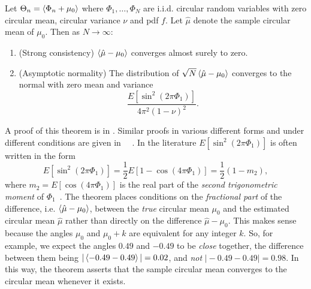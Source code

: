 \documentclass[journal]{../bib/IEEEtran}
\begin{document}
\begin{theorem}\label{thm:asymp_arg_complex_mean}
Let $\Theta_n = \left< \Phi_n + \mu_0 \right>$ where $\Phi_1, \dots, \Phi_N$ are i.i.d. circular random variables with zero circular mean, circular variance $\nu$ and pdf $f$. Let $\hat{\mu}$ denote the sample circular mean of $\mu_0$. Then as $N\rightarrow\infty$:
\begin{enumerate}
\item (Strong consistency) $\left< \hat{\mu} - \mu_0 \right>$ converges almost surely to zero.
\item (Asymptotic normality) The distribution of $\sqrt{N}\left< \hat{\mu} - \mu_0 \right>$ converges to the normal with zero mean and variance 
\begin{equation}\label{eq:asympvarscm}
\frac{E[\sin^2(2\pi\Phi_1)]}{4\pi^2(1 - \nu)^2}.
\end{equation}
\end{enumerate}
\end{theorem}
A proof of this theorem is in \cite[p.~88]{McKilliam2010thesis}. Similar proofs in various different forms and under different conditions are given in \cite{Quinn2009_dasp_phase_only_information_loss,Fisher_common_mean_direction_dir_est_no_dist_assumptions1983}~\cite[Chapter~4]{Jammalamadaka_dir_stat_book}~\cite[p.~111]{mardia_stat_dir_data_book_1975}. In the literature $E[\sin^2(2\pi\Phi_1)]$ is often written in the form
\[
E[\sin^2(2\pi\Phi_1)] = \frac{1}{2} E[ 1 - \cos(4\pi\Phi_1) ] = \frac{1}{2}(1 - m_2),
\]
where $m_2 = E[\cos(4\pi\Phi_1)]$ is the real part of the \emph{second trigonometric moment} of $\Phi_1$~\cite{Fisher_common_mean_direction_dir_est_no_dist_assumptions1983,Fisher1993,Bhattacharya_int_ext_means_2003}.  The theorem places conditions on the \emph{fractional part} of the difference, i.e. $\left< \hat{\mu} - \mu_0 \right>$, between the \emph{true} circular mean $\mu_0$ and the estimated circular mean $\hat{\mu}$ rather than directly on the difference $\hat{\mu} - \mu_0$.  This makes sense because the angles $\mu_0$ and $\mu_0 + k$ are equivalent for any integer $k$. So, for example, we expect the angles $0.49$ and $-0.49$ to be \emph{close} together, the difference between them being $\vert\left< -0.49 - 0.49 \right>\vert = 0.02$, and \emph{not} $\vert -0.49 - 0.49\vert = 0.98$. In this way, the theorem asserts that the sample circular mean converges to the circular mean whenever it exists. 

\end{document}
